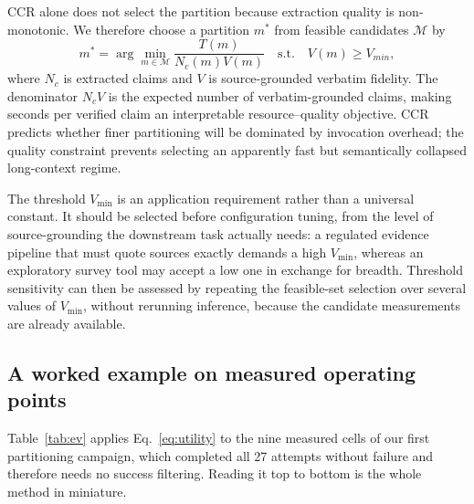 \documentclass[conference]{IEEEtran}
\begin{document}
CCR alone does not select the partition because extraction quality is non-monotonic. We therefore choose a partition $m^*$ from feasible candidates $\mathcal{M}$ by
\begin{equation}
m^*=\arg\min_{m\in\mathcal{M}} \frac{T(m)}{N_c(m)V(m)}
\quad \text{s.t.}\quad V(m)\ge V_{min},
\label{eq:utility}
\end{equation}
where $N_c$ is extracted claims and $V$ is source-grounded verbatim fidelity. The denominator $N_cV$ is the expected number of verbatim-grounded claims, making seconds per verified claim an interpretable resource--quality objective. CCR predicts whether finer partitioning will be dominated by invocation overhead; the quality constraint prevents selecting an apparently fast but semantically collapsed long-context regime.

The threshold $V_{\min}$ is an application requirement rather than a universal constant. It should be selected before configuration tuning, from the level of source-grounding the downstream task actually needs: a regulated evidence pipeline that must quote sources exactly demands a high $V_{\min}$, whereas an exploratory survey tool may accept a low one in exchange for breadth. Threshold sensitivity can then be assessed by repeating the feasible-set selection over several values of $V_{\min}$, without rerunning inference, because the candidate measurements are already available.

\subsection{A worked example on measured operating points}
\label{sec:worked}
Table~\ref{tab:ev} applies Eq.~\ref{eq:utility} to the nine measured cells of our first partitioning campaign, which completed all 27 attempts without failure and therefore needs no success filtering. Reading it top to bottom is the whole method in miniature.
\end{document}
